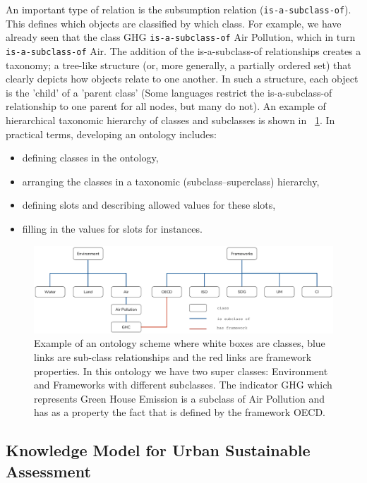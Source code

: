 \documentclass[preprint,12pt]{elsarticle}
\begin{document}
An important type of relation is the subsumption relation (\texttt{is-a-subclass-of}). This defines which objects are classified by which class. For example, we have already seen that the class GHG \texttt{is-a-subclass-of} Air Pollution, which in turn \texttt{is-a-subclass-of} Air. The addition of the is-a-subclass-of relationships creates a taxonomy; a tree-like structure (or, more generally, a partially ordered set) that clearly depicts how objects relate to one another. In such a structure, each object is the 'child' of a 'parent class' (Some languages restrict the is-a-subclass-of relationship to one parent for all nodes, but many do not). An example of hierarchical taxonomic hierarchy of classes and subclasses is shown in \figurename~\ref{fig:ontologyScheme}. In practical terms, developing an ontology includes:
\begin{itemize}
\item defining classes in the ontology,
\item arranging the classes in a taxonomic (subclass–superclass) hierarchy,
\item defining slots and describing allowed values for these slots,
\item filling in the values for slots for instances.
\end{itemize}
\begin{figure}[htb!]
\centering
\includegraphics[width=1\textwidth]{figures/ontology2.pdf}
\caption{Example of an ontology scheme where white boxes are classes, blue links are sub-class relationships and the red links are framework properties. In this ontology we have two super classes: Environment and Frameworks with different subclasses. The indicator GHG which represents Green House Emission is a subclass of Air Pollution and has as a property the fact that is defined by the framework OECD. }
\label{fig:ontologyScheme}
\end{figure}

\subsection{Knowledge Model for Urban Sustainable Assessment}
\end{document}
